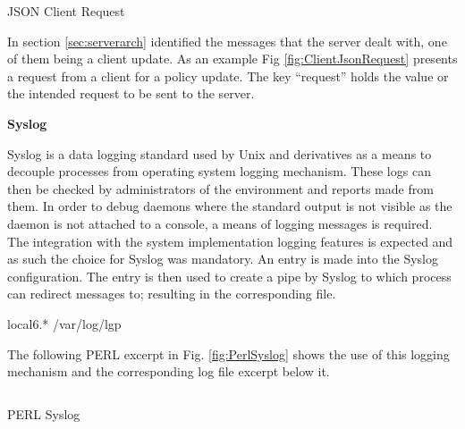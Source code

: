 		\vspace{2mm}
		\begin{figurehere}
			\inputminted[linenos=true,fontsize=\footnotesize,tabsize=2]{perl}{pages/chapter3/smippets/jsonmessage.pl}
			\vspace{-2mm}
			\caption{JSON Client Request}
			\label{fig:ClientJsonRequest}
		\end{figurehere}
				
		\normalsize
		{	
			In section \ref{sec:serverarch} identified the messages that the server dealt with, one of them being a client update.  
			As an example Fig \ref{fig:ClientJsonRequest} presents a request from a client for a policy update.  The key ``request'' holds the value
			or the intended request to be sent to the server.
			\newline
		}
		
		\large{\bfseries{Syslog}}	
		
		\normalsize
		{		
			Syslog is a data logging standard used by Unix and derivatives as a means to decouple processes from operating system logging mechanism.
			These logs can then be checked by administrators of the environment and reports made from them.  In order to debug daemons where the standard output is not visible
			as the daemon is not attached to a console, a means of logging messages is required.  The integration with the system implementation logging features
			is expected and as such the choice for Syslog was mandatory.
			\newline
			\newline
			An entry is made into the Syslog configuration.  The entry is then used to create a pipe by Syslog to which process can redirect messages to; 
			 resulting in the corresponding file.
			\newline
			\begin{center}
			local6.*						/var/log/lgp
			\end{center}
			\vspace{5mm}
			The following PERL excerpt in Fig. \ref{fig:PerlSyslog} shows the use of this logging mechanism and the corresponding log file excerpt below it.
		}
				
		\begin{figurehere}
			\inputminted[linenos=true,fontsize=\footnotesize,tabsize=2]{perl}{pages/chapter3/smippets/syslog.pl}
			\vspace{-2mm}
			\caption{PERL Syslog}
			\label{fig:PerlSyslog}
		\end{figurehere}
		
